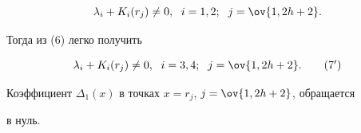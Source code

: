 \begin{equation} 


\lambda_i+K_i(r_j)\ne 0,\ \; i=1,2;\ \; j=\ov{1,2h+2}. 


\end{equation} 


Тогда из (6) легко получить 


\begin{equation} 


\lambda_i+K_i(r_j)\ne 0,\ \; i=3,4;\ \; j=\ov{1,2h+2}. 


\tag{7$'$} 


\end{equation} 


 


\begin{lemnonum} 


Коэффициент $\Delta_1(x)$ в точках $x=r_j$, $j=\ov{1,2h+2}$, обращается 


в нуль. 


\end{lemnonum} 


 


